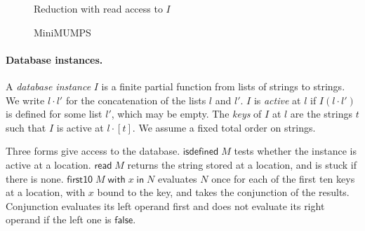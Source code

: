 \documentclass[11pt]{article}
\newcommand{\kw}[1]{\mathsf{#1}}
\newcommand{\true}{\kw{true}}
\newcommand{\rulename}[1]{\textsc{#1}}
\newcommand{\false}{\kw{false}}
\newcommand{\ifte}[3]{\kw{if}\;#1\;\kw{then}\;#2\;\kw{else}\;#3}
\newcommand{\isdef}[1]{\kw{isdefined}\;#1}
\newcommand{\readm}[1]{\kw{read}\;#1}
\newcommand{\firstten}[3]{\kw{first10}\;#1\;\kw{with}\;#2\;\kw{in}\;#3}
\newcommand{\judgmentbox}[2]{\medskip\noindent\fbox{$#1$}\quad #2\par\vspace{-1.2\baselineskip}}
\theoremstyle{remark}
\begin{document}
\begin{figure}[!htbp]
\judgmentbox{I \mid M \hookrightarrow M'}{Reduction with read access to $I$}
\caption{MiniMUMPS}
\label{fig:minimumps}
\end{figure}

\paragraph{Database instances.}
A \emph{database instance} $I$ is a finite partial function from lists of strings to strings. We
write $l \cdot l'$ for the concatenation of the lists $l$ and $l'$. $I$ is \emph{active} at $l$ if
$I(l \cdot l')$ is defined for some list $l'$, which may be empty. The \emph{keys} of $I$ at $l$
are the strings $t$ such that $I$ is active at $l \cdot [t]$. We assume a fixed total order on
strings.

Three forms give access to the database. $\isdef{M}$ tests whether the instance is active at a
location. $\readm{M}$ returns the string stored at a location, and is stuck if there is none.
$\firstten{M}{x}{N}$ evaluates $N$ once for each of the first ten keys at a location, with $x$
bound to the key, and takes the conjunction of the results. Conjunction evaluates its left
operand first and does not evaluate its right operand if the left one is $\false$.
\end{document}
